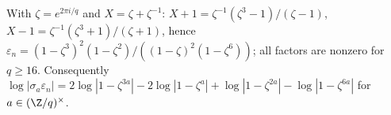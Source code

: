 With $\zeta=e^{2\pi i/q}$ and $X=\zeta+\zeta^{-1}$: $X+1=\zeta^{-1}(\zeta^3-1)/(\zeta-1)$, $X-1=\zeta^{-1}(\zeta^3+1)/(\zeta+1)$, hence $\varepsilon_n=(1-\zeta^3)^2(1-\zeta^2)/((1-\zeta)^2(1-\zeta^6))$; all factors are nonzero for $q\ge16$. Consequently $\log|\sigma_a\varepsilon_n|=2\log|1-\zeta^{3a}|-2\log|1-\zeta^a|+\log|1-\zeta^{2a}|-\log|1-\zeta^{6a}|$ for $a\in(\Z/q)^\times$.
